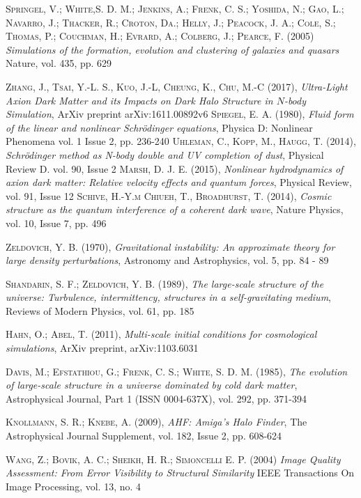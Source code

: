 \documentclass[a4paper,openright,12pt]{book}
\begin{document}
\begin{thebibliography}{a}
 \textsc{Springel, V.; White,S. D. M.; Jenkins, A.; Frenk, C. S.; Yoshida, N.; Gao, L.; Navarro, J.; Thacker, R.; Croton, Da.; Helly, J.; Peacock, J. A.; Cole, S.; Thomas, P.; Couchman, H.; Evrard, A.; Colberg, J.; Pearce, F. (2005)}
\textit{Simulations of the formation, evolution and clustering of galaxies and quasars}
Nature, vol. 435, pp. 629

 \textsc{Zhang, J., Tsai, Y.-L. S., Kuo, J.-L, Cheung, K., Chu, M.-C (2017)},
\textit{Ultra-Light Axion Dark Matter and its Impacts on Dark Halo Structure in $N$-body Simulation},
ArXiv preprint  arXiv:1611.00892v6
 \textsc{Spiegel, E. A. (1980)},
\textit{Fluid form of the linear and nonlinear Schrödinger equations},
Physica D: Nonlinear Phenomena vol. 1 Issue 2, pp. 236-240 
 \textsc{Uhleman, C., Kopp, M., Haugg, T. (2014)},
\textit{Schrödinger method as N-body double and UV completion of dust},
Physical Review D. vol. 90, Issue 2 
\textsc{Marsh, D. J. E. (2015)},
\textit{Nonlinear hydrodynamics of axion dark matter: Relative velocity effects and quantum forces},
Physical Review, vol. 91, Issue 12
 \textsc{Schive, H.-Y.m Chiueh, T., Broadhurst, T. (2014)},
\textit{Cosmic structure as the quantum interference of a coherent dark wave},
Nature Physics, vol. 10, Issue 7, pp. 496

 \textsc{Zeldovich, Y. B. (1970)},
\textit{Gravitational instability: An approximate theory for large density perturbations},
Astronomy and Astrophysics, vol. 5, pp. 84 - 89

 \textsc{Shandarin, S. F.; Zeldovich, Y. B. (1989)},
\textit{The large-scale structure of the universe: Turbulence, intermittency, structures in a self-gravitating medium},
Reviews of Modern Physics, vol. 61, pp. 185

 \textsc{Hahn, O.; Abel, T. (2011)},
\textit{Multi-scale initial conditions for cosmological simulations},
ArXiv preprint, arXiv:1103.6031

 \textsc{Davis, M.; Efstathiou, G.; Frenk, C. S.; White, S. D. M. (1985)},
\textit{The evolution of large-scale structure in a universe dominated by cold dark matter},
Astrophysical Journal, Part 1 (ISSN 0004-637X), vol. 292, pp. 371-394 

 \textsc{Knollmann, S. R.; Knebe, A. (2009)},
\textit{AHF: Amiga's Halo Finder},
The Astrophysical Journal Supplement, vol. 182, Issue 2, pp. 608-624

 \textsc{Wang, Z.; Bovik, A. C.; Sheikh, H. R.; Simoncelli E. P. (2004)}
\textit{Image Quality Assessment: From Error Visibility to Structural Similarity}
IEEE Transactions On Image Processing, vol. 13, no. 4
\end{thebibliography}
\end{document}
